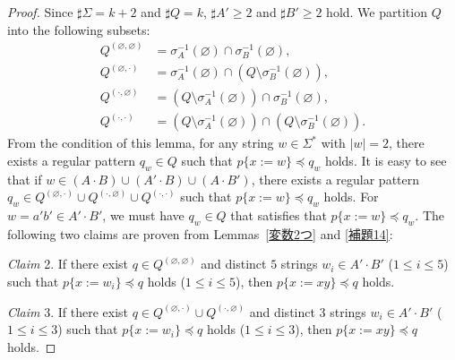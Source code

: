 \begin{proof}
Since $\sharp \Sigma = k + 2$ and $\sharp Q = k$, $\sharp A' \geq 2$ and $\sharp B' \geq 2$ hold.
We partition $Q$ into the following subsets:
\begin{align*}
  Q^{(\varnothing,\varnothing)} & = \sigma_{A}^{-1}(\varnothing) \cap \sigma_{B}^{-1}(\varnothing),\\
  Q^{(\varnothing,\cdot)} & = \sigma_{A}^{-1}(\varnothing) \cap (Q\setminus \sigma_{B}^{-1}(\varnothing)),\\
  Q^{(\cdot,\varnothing)} & = (Q\setminus \sigma_{A}^{-1}(\varnothing)) \cap \sigma_{B}^{-1}(\varnothing),\\
  Q^{(\cdot,\cdot)} & = (Q\setminus \sigma_{A}^{-1}(\varnothing)) \cap (Q\setminus \sigma_{B}^{-1}(\varnothing)).
\end{align*}
From the condition of this lemma, for any string $w \in \Sigma^{\ast}$ with $|w|=2$, there exists a regular pattern $q_{w} \in Q$ such that $p \{ x:=w \} \preceq q_{w}$ holds.
It is easy to see that if $w \in (A\cdot B) \cup (A'\cdot B) \cup (A\cdot B')$, there exists a regular pattern $q_{w} \in Q^{(\varnothing,\cdot)} \cup Q^{(\cdot,\varnothing)} \cup Q^{(\cdot,\cdot)}$ such that $p \{ x:=w \} \preceq q_{w}$ holds.
For $w=a'b'\in A'\cdot B'$, we must have $q_{w} \in Q$ that satisfies that $p \{ x:=w \} \preceq q_{w}$. The following two claims are proven from Lemmas~\ref{変数2つ} and \ref{補題14}:

\smallskip

\noindent
\textit{Claim} 2. If there exist $q \in Q^{(\varnothing,\varnothing)}$ and distinct $5$ strings $w_{i} \in A'\cdot B'$ ($1\leq i\leq 5$) such  that $p \{ x:=w_{i} \} \preceq q$ holds ($1\leq i\leq 5$),  then $p \{ x:=xy \} \preceq q$ holds.

\smallskip

\noindent
\textit{Claim} 3. If there exist $q \in Q^{(\varnothing,\cdot)} \cup Q^{(\cdot,\varnothing)}$ and distinct $3$ strings $w_{i} \in A'\cdot B'$ ($1\leq i\leq 3$) such that $p \{ x:=w_{i} \} \preceq q$ holds ($1\leq i\leq 3$),  then $p \{ x:=xy \} \preceq q$ holds.


\end{proof}

